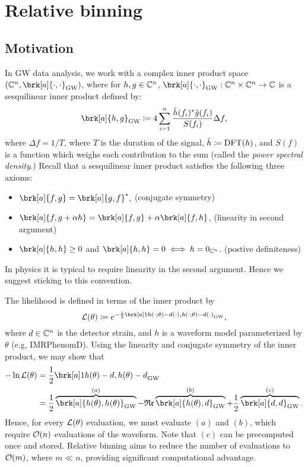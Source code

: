 
\section{Relative binning}
\subsection{Motivation}
In GW data analysis, we work with a complex inner product space $(\com^n, \brk[a]{\cdot,\cdot}_{\text{GW}})$, where for $h,g \in \mathbb{C}^n$, $\brk[a]{\cdot,\cdot}_{\text{GW}}:\com^n \times \com^n \to \com$ is a sesquilinear inner product defined by:
\begin{equation}\label{}
\brk[a]{h,g}_{\text{GW}} \defn 4 \sum_{i=1}^n \frac{\tilde{h}(f_i)^* \tilde{g}(f_i)}{S(f_i)} \Delta f,
\end{equation}
where $\Delta f = 1/T$, where $T$ is the duration of the signal, $\tilde{h} \coloneqq \text{DFT}(h)$, and $S(f)$ is a function which weighs each contribution to the sum (called the \textit{power spectral density.})
Recall that a sesquilinear inner product satisfies the following three axioms:
\begin{itemize}
  \item $\brk[a]{f,g} = \brk[a]{g,f}^*,$ \hfill{(conjugate symmetry)}
  \item $\brk[a]{f, g + \alpha h} = \brk[a]{f,g} + \alpha \brk[a]{f,h}$, \hfill{(linearity in second argument)}
  \item $\brk[a]{h,h} \ge 0$ and $\brk[a]{h,h} = 0 \iff h = 0_{\com^n}$. \hfill{(postive definiteness)}
\end{itemize}
\begin{remark}[]\label{}
In physics it is typical to require linearity in the second argument. Hence we suggest sticking to this convention.
\end{remark}
The likelihood is defined in terms of the inner product by
\begin{equation}\label{}
\like(\theta) \defn e^{-\frac{1}{2} \brk[a]1{h(\cdot ; \theta) - d(\cdot),h(\cdot ; \theta) - d(\cdot)}_{\text{GW}}},
\end{equation}
where $d \in \mathbb{C}^n$ is the detector strain, and $h$ is a waveform model parameterized by $\theta$ (e.g, IMRPhenomD). Using the linearity and conjugate symmetry of the inner product, we may show that
\begin{align*}\label{}
-\ln \like (\theta) &= \frac{1}{2}\brk[a]1{h(\theta) - d,h(\theta) - d}_{\text{GW}} \\
&= \frac{1}{2}\overbrace{\brk[a]{h(\theta), h(\theta)}_{\text{GW}}}^{(a)} - \re \overbrace{\brk[a]{h(\theta), d}_{\text{GW}}}^{(b)} + \frac{1}{2}\overbrace{\brk[a]{d, d}_{\text{GW}}}^{\text(c)}.
\end{align*}
Hence, for every $\mathcal{L}(\theta)$ evaluation, we must evaluate $(a)$ and $(b)$, which require $\mathcal{O}(n)$ evaluations of the waveform.
Note that $(c)$ can be precomputed once and stored.
Relative binning aims to reduce the number of evaluations to $\mathcal{O}(m)$, where $m \ll n$, providing significant computational advantage.

